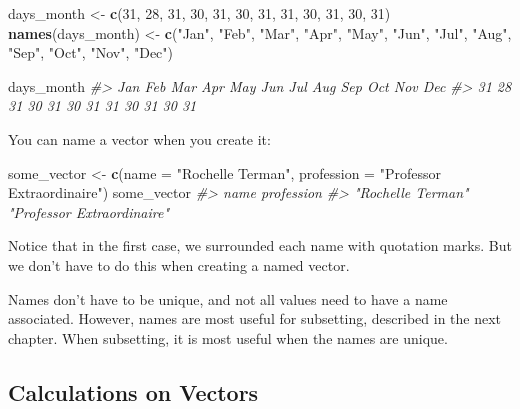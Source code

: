 \documentclass[]{book}
\newenvironment{Shaded}{\begin{snugshade}}{\end{snugshade}}
\newcommand{\CommentTok}[1]{\textcolor[rgb]{0.56,0.35,0.01}{\textit{#1}}}
\newcommand{\DataTypeTok}[1]{\textcolor[rgb]{0.13,0.29,0.53}{#1}}
\newcommand{\DecValTok}[1]{\textcolor[rgb]{0.00,0.00,0.81}{#1}}
\newcommand{\KeywordTok}[1]{\textcolor[rgb]{0.13,0.29,0.53}{\textbf{#1}}}
\newcommand{\NormalTok}[1]{#1}
\newcommand{\StringTok}[1]{\textcolor[rgb]{0.31,0.60,0.02}{#1}}
\begin{document}
\begin{Shaded}
\begin{Highlighting}[]
\NormalTok{days_month <-}\StringTok{ }\KeywordTok{c}\NormalTok{(}\DecValTok{31}\NormalTok{, }\DecValTok{28}\NormalTok{, }\DecValTok{31}\NormalTok{, }\DecValTok{30}\NormalTok{, }\DecValTok{31}\NormalTok{, }\DecValTok{30}\NormalTok{, }\DecValTok{31}\NormalTok{, }\DecValTok{31}\NormalTok{, }\DecValTok{30}\NormalTok{, }\DecValTok{31}\NormalTok{, }\DecValTok{30}\NormalTok{, }\DecValTok{31}\NormalTok{)}
\KeywordTok{names}\NormalTok{(days_month) <-}\StringTok{ }\KeywordTok{c}\NormalTok{(}\StringTok{"Jan"}\NormalTok{, }\StringTok{"Feb"}\NormalTok{, }\StringTok{"Mar"}\NormalTok{, }\StringTok{"Apr"}\NormalTok{, }\StringTok{"May"}\NormalTok{, }\StringTok{"Jun"}\NormalTok{, }\StringTok{"Jul"}\NormalTok{, }\StringTok{"Aug"}\NormalTok{, }\StringTok{"Sep"}\NormalTok{, }\StringTok{"Oct"}\NormalTok{, }\StringTok{"Nov"}\NormalTok{, }\StringTok{"Dec"}\NormalTok{)}

\NormalTok{days_month}
\CommentTok{#> Jan Feb Mar Apr May Jun Jul Aug Sep Oct Nov Dec }
\CommentTok{#>  31  28  31  30  31  30  31  31  30  31  30  31}
\end{Highlighting}
\end{Shaded}

You can name a vector when you create it:

\begin{Shaded}
\begin{Highlighting}[]
\NormalTok{some_vector <-}\StringTok{ }\KeywordTok{c}\NormalTok{(}\DataTypeTok{name =} \StringTok{"Rochelle Terman"}\NormalTok{, }\DataTypeTok{profession =} \StringTok{"Professor Extraordinaire"}\NormalTok{)}
\NormalTok{some_vector}
\CommentTok{#>                       name                 profession }
\CommentTok{#>          "Rochelle Terman" "Professor Extraordinaire"}
\end{Highlighting}
\end{Shaded}

Notice that in the first case, we surrounded each name with quotation marks. But we don't have to do this when creating a named vector.

Names don't have to be unique, and not all values need to have a name associated. However, names are most useful for subsetting, described in the next chapter. When subsetting, it is most useful when the names are unique.

\hypertarget{calculations-on-vectors}{%
\subsection{Calculations on Vectors}\label{calculations-on-vectors}}
\end{document}
